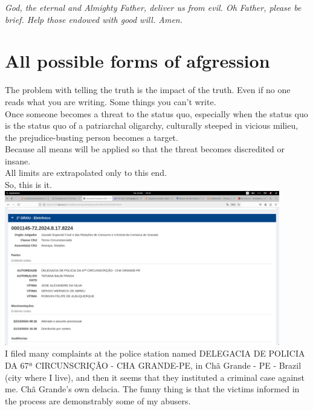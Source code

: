 \documentclass[11pt]{book}
\begin{document}
\noindent \begin{center} \emph{God, the eternal and Almighty Father, deliver us from evil. Oh Father, please be brief. Help those endowed with good will. Amen.} \end{center}

\chapter{All possible forms of afgression}

\noindent The problem with telling the truth is the impact of the truth. Even if no one reads what you are writing. Some things you can't write. \\

\noindent Once someone becomes a threat to the status quo, especially when the status quo is the status quo of a patriarchal oligarchy, culturally steeped in vicious milieu, the prejudice-busting person becomes a target. \\

\noindent Because all means will be applied so that the threat becomes discredited or insane. \\

\noindent All limits are extrapolated only to this end. \\

\noindent So, this is it. \\

\includegraphics[width=0.9\textwidth]{figures/Screenshot from 2024-10-22 10.10.12.png} \\

\noindent I filed many complaints at the police station named DELEGACIA DE POLICIA DA 67ª CIRCUNSCRIÇÃO - CHA GRANDE-PE, in Chã Grande - PE - Brazil (city where I live), and then it seems that they instituted a criminal case against me. Chã Grande's own delacia. The funny thing is that the victims informed in the process are demonstrably some of my abusers. \\
\end{document}
